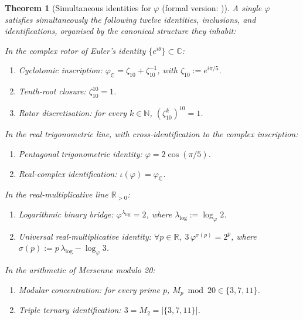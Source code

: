 \documentclass[11pt]{amsart}
\newtheorem{Theorem}{Theorem}[section]
\theoremstyle{definition}
\newcommand{\golden}{\varphi}
\newcommand{\Mp}{M_{p}}
\begin{document}
\begin{Theorem}[Simultaneous identities for $\golden$ (formal version:
)]\label{thm:coincidence-intro}
A single $\golden$ satisfies simultaneously the following twelve
identities, inclusions, and identifications, organised by the
canonical structure they inhabit:

\smallskip
\noindent\emph{In the complex rotor of Euler's identity
$\{e^{i\theta}\}\subset\mathbb{C}$:}
\begin{enumerate}[topsep=0.2em,itemsep=0.1em,leftmargin=2.3em]
  \item[\textup{(i)}] \emph{Cyclotomic inscription:}
    $\golden_\mathbb{C} = \zeta_{10}+\zeta_{10}^{-1}$, with
    $\zeta_{10}:=e^{i\pi/5}$.
  \item[\textup{(ii)}] \emph{Tenth-root closure:} $\zeta_{10}^{10}=1$.
  \item[\textup{(xii)}] \emph{Rotor discretisation:} for every
    $k\in\mathbb{N}$, $(\zeta_{10}^{k})^{10}=1$.
\end{enumerate}

\smallskip
\noindent\emph{In the real trigonometric line, with cross-identification
to the complex inscription:}
\begin{enumerate}[topsep=0.2em,itemsep=0.1em,leftmargin=2.3em]
  \item[\textup{(iii)}] \emph{Pentagonal trigonometric identity:}
    $\golden = 2\cos(\pi/5)$.
  \item[\textup{(viii)}] \emph{Real-complex identification:}
    $\iota(\golden) = \golden_\mathbb{C}$.
\end{enumerate}

\smallskip
\noindent\emph{In the real-multiplicative line $\mathbb{R}_{>0}$:}
\begin{enumerate}[topsep=0.2em,itemsep=0.1em,leftmargin=2.3em]
  \item[\textup{(iv)}] \emph{Logarithmic binary bridge:}
    $\golden^{\lambda_{\log}}=2$, where
    $\lambda_{\log}:=\log_{\golden}2$.
  \item[\textup{(v)}] \emph{Universal real-multiplicative identity:}
    $\forall p\in\mathbb{R},\;3\,\golden^{\sigma(p)}=2^{p}$, where
    $\sigma(p):=p\,\lambda_{\log}-\log_{\golden}3$.
\end{enumerate}

\smallskip
\noindent\emph{In the arithmetic of Mersenne modulo 20:}
\begin{enumerate}[topsep=0.2em,itemsep=0.1em,leftmargin=2.3em]
  \item[\textup{(vi)}] \emph{Modular concentration:} for every prime
    $p$, $\Mp\bmod 20\in\{3,7,11\}$.
  \item[\textup{(vii)}] \emph{Triple ternary identification:}
    $3 = M_{2} = |\{3,7,11\}|$.
\end{enumerate}


\end{Theorem}
\end{document}
